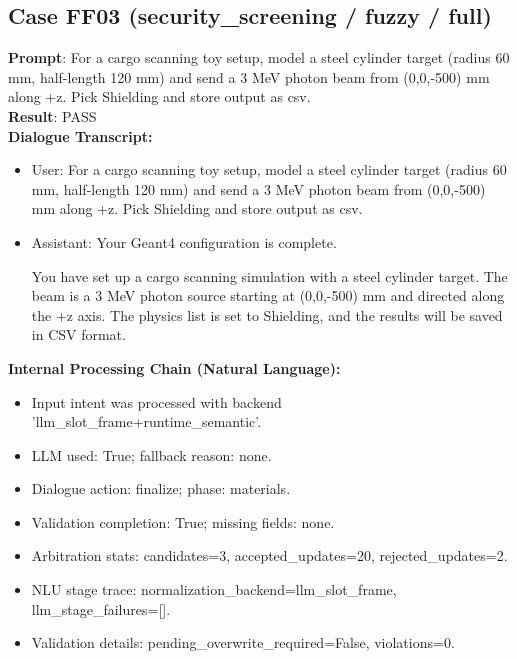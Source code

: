 \documentclass[11pt]{ctexart}
\begin{document}
\subsection{Case FF03 (security\_screening / fuzzy / full)}
\textbf{Prompt}: For a cargo scanning toy setup, model a steel cylinder target (radius 60 mm, half-length 120 mm) and send a 3 MeV photon beam from (0,0,-500) mm along +z. Pick Shielding and store output as csv.\\
\textbf{Result}: PASS\\
\textbf{Dialogue Transcript:}
\begin{itemize}
\item User: For a cargo scanning toy setup, model a steel cylinder target (radius 60 mm, half-length 120 mm) and send a 3 MeV photon beam from (0,0,-500) mm along +z. Pick Shielding and store output as csv.
\item Assistant: Your Geant4 configuration is complete.

You have set up a cargo scanning simulation with a steel cylinder target. The beam is a 3 MeV photon source starting at (0,0,-500) mm and directed along the +z axis. The physics list is set to Shielding, and the results will be saved in CSV format.
\end{itemize}
\textbf{Internal Processing Chain (Natural Language):}
\begin{itemize}
\item Input intent was processed with backend 'llm\_slot\_frame+runtime\_semantic'.
\item LLM used: True; fallback reason: none.
\item Dialogue action: finalize; phase: materials.
\item Validation completion: True; missing fields: none.
\item Arbitration stats: candidates=3, accepted\_updates=20, rejected\_updates=2.
\item NLU stage trace: normalization\_backend=llm\_slot\_frame, llm\_stage\_failures=[].
\item Validation details: pending\_overwrite\_required=False, violations=0.
\end{itemize}
\end{document}
